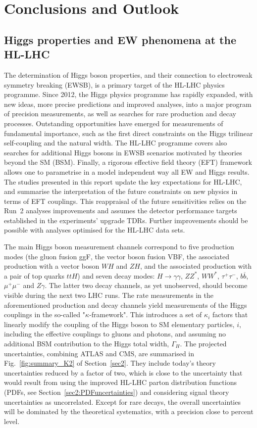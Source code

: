 \documentclass[../report.tex]{subfiles}
\begin{document}
\clearpage
\section{Conclusions and Outlook}
\subsection{Higgs properties and EW phenomena at the HL-LHC}
The determination of Higgs boson properties, and their connection to electroweak symmetry breaking (EWSB), is a primary target of the HL-LHC physics programme. Since 2012, the Higgs physics programme has rapidly expanded, with new ideas, more precise predictions and improved analyses, into a major program of precision measurements, as well as searches for rare production and decay processes. Outstanding opportunities have emerged for measurements of fundamental importance, such as the first direct constraints on the Higgs trilinear self-coupling and the natural width. The HL-LHC programme covers also searches for additional Higgs bosons in EWSB scenarios motivated by theories beyond the SM (BSM). Finally, a rigorous effective field theory (EFT) framework allows one to parametrise in a model independent way all EW and Higgs results. 
The studies presented in this report update the key expectations for HL-LHC,  and summarise the interpretation of the future constraints on new physics in terms of EFT couplings. This reappraisal of the future sensitivities relies on the Run~2 analyses improvements and assumes the detector performance targets established in the experiments' upgrade TDRs.
Further improvements should be possible with analyses optimised for the HL-LHC data sets.

The main Higgs boson measurement channels correspond to five production modes (the gluon fusion ggF, the vector boson fusion VBF, the associated production with a vector boson $WH$ and $ZH$, and the associated production with a pair of top quarks $ttH$) and seven decay modes: $H \to \gamma\gamma$, $ZZ^*$, $WW^*$, $\tau^+\tau^-$, $b\overline{b}$, $\mu^+\mu^-$ and $Z\gamma$. The latter two decay channels, as yet unobserved, should become visible during the next two LHC runs. 
The rate measurements in the aforementioned production and decay channels yield measurements of the Higgs couplings in the so-called "$\kappa$-framework". This introduces a set of $\kappa_i$ factors that linearly modify the coupling of the Higgs boson to SM elementary particles, $i$, including the effective couplings to gluons and photons, and assuming no additional BSM contribution to the Higgs total width, $\Gamma_H$. The projected uncertainties, combining ATLAS and CMS, are summarised in Fig.~\ref{fig:summary_K2} of Section~\ref{sec2}. They include today's theory uncertainties reduced by a factor of two, which is close to the uncertainty that would result from using the improved HL-LHC parton distribution functions (PDFs, see Section~\ref{sec2:PDFuncertainties}) and considering signal theory uncertainties as uncorrelated. Except for rare decays, the overall uncertainties will be dominated by the theoretical systematics, with a precision close to percent level.
\end{document}
